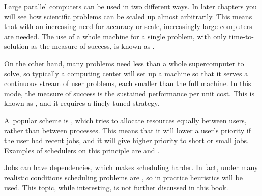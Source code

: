 
Large parallel computers can be used in two different ways. In later
chapters you will see how scientific problems can be scaled up almost
arbitrarily. This means that with an increasing need for accuracy or
scale, increasingly large computers are needed. The use of a whole
machine for a single problem, with only time-to-solution as the
measure of success, is known as .

On the other hand, many problems need less than a whole supercomputer
to solve, so typically a computing center will set up a machine so
that it serves a continuous stream of user problems, each smaller than
the full machine. In this mode, the measure of success is the
sustained performance per unit cost. This is known as
, and it requires a finely tuned
 strategy. 

A~popular scheme is
, which tries to allocate resources
equally between users, rather than between processes. This means
that it will lower a user's priority if the user had recent jobs, and it will 
give higher priority to short or small jobs. Examples of schedulers 
on this principle are  and .

Jobs can have dependencies, which makes scheduling harder. In fact,
under many realistic conditions scheduling problems are
, so in practice heuristics will be used.
This topic, while interesting, is not further discussed in this book.
